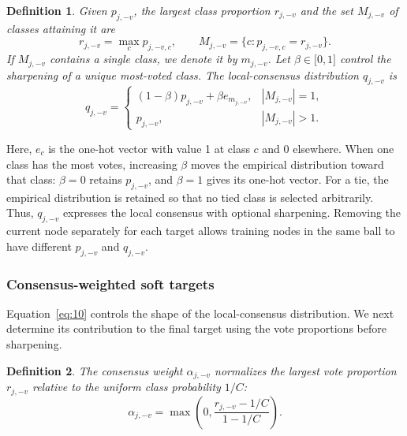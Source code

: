 \documentclass[10pt,letterpaper,nopreprintline]{elsarticle}
\theoremstyle{plain}
\newtheorem{definition}{Definition}
\begin{document}
\Needspace{64pt}

\begin{definition}
Given \(p_{j, - v}\), the largest class proportion \(r_{j, - v}\) and the set \(M_{j, - v}\) of classes attaining it are
\begin{equation}\label{eq:9}
r_{j, - v} = \max_{c}p_{j, - v,c},\quad\quad M_{j, - v} = \{ c:p_{j, - v,c} = r_{j, - v}\}.
\end{equation}
If \(M_{j, - v}\) contains a single class, we denote it by \(m_{j, - v}\). Let \(\beta \in \lbrack 0,1\rbrack\) control the sharpening of a unique most-voted class. The local-consensus distribution \(q_{j, - v}\) is
\begin{equation}\label{eq:10}
q_{j, - v} = \begin{cases}
(1 - \beta)p_{j, - v} + \beta e_{m_{j, - v}}, & |M_{j, - v}| = 1, \\
p_{j, - v}, & |M_{j, - v}| > 1.
\end{cases}
\end{equation}
\end{definition}

Here, \(e_c\) is the one-hot vector with value 1 at class \(c\) and 0 elsewhere. When one class has the most votes, increasing \(\beta\) moves the empirical distribution toward that class: \(\beta=0\) retains \(p_{j,-v}\), and \(\beta=1\) gives its one-hot vector. For a tie, the empirical distribution is retained so that no tied class is selected arbitrarily. Thus, \(q_{j,-v}\) expresses the local consensus with optional sharpening. Removing the current node separately for each target allows training nodes in the same ball to have different \(p_{j,-v}\) and \(q_{j,-v}\).

\subsubsection{Consensus-weighted soft targets}\label{sec:3.3.2}

Equation~\eqref{eq:10} controls the shape of the local-consensus distribution. We next determine its contribution to the final target using the vote proportions before sharpening.

\begin{definition}
The consensus weight \(\alpha_{j, - v}\) normalizes the largest vote proportion \(r_{j, - v}\) relative to the uniform class probability \(1/C\):
\begin{equation}\label{eq:11}
\alpha_{j, - v} = \max\left( 0,\frac{r_{j, - v} - 1/C}{1 - 1/C} \right).
\end{equation}
\end{definition}
\end{document}
